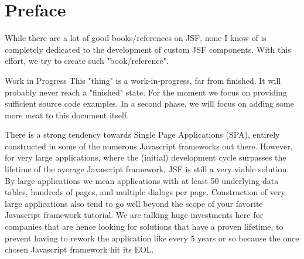 %

\chapter*{Preface}
While there are a lot of good books/references on JSF, none I know of is completely dedicated to the development of custom JSF components.
With this effort, we try to create such "book/reference".

\begin{TODO}{Work in Progress}
	This "thing" is a work-in-progress, far from finished.
	It will probably never reach a "finished" state.
	For the moment we focus on providing sufficient source code examples.
	In a second phase, we will focus on adding some more meat to this document itself.
\end{TODO}

There is a strong tendency towards Single Page Applications (SPA), entirely constructed in some of the numerous Javascript frameworks out there.
However, for very large applications, where the (initial) development cycle surpasses the lifetime of the average Javascript framework, JSF is still a very viable solution.
By large applications we mean applications with at least 50 underlying data tables, hundreds of pages, and multiple dialogs per page.
Construction of very large applications also tend to go well beyond the scope of your favorite Javascript framework tutorial.
We are talking huge investments here for companies that are hence looking for solutions that have a proven lifetime, to prevent having to rework the application like every 5 years or so because the once chosen Javascript framework hit its EOL.


